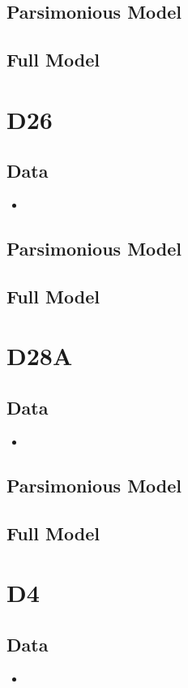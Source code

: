 \documentclass[12pt]{amsart}
\begin{document}
\subsection{Parsimonious Model}

\subsection{Full Model}

\section{D26}
\subsection{Data}
\begin{itemize}
\item
\end{itemize}
\subsection{Parsimonious Model}

\subsection{Full Model}

\section{D28A}
\subsection{Data}
\begin{itemize}
\item
\end{itemize}
\subsection{Parsimonious Model}

\subsection{Full Model}

\section{D4}
\subsection{Data}
\begin{itemize}
\item
\end{itemize}
\end{document}
